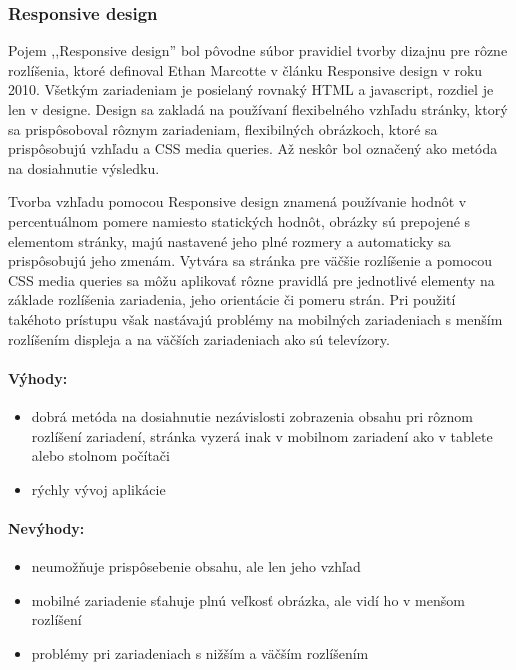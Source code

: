 \subsubsection{Responsive design} %
\label{ssub:responsive_design}

Pojem ,,Responsive design'' bol pôvodne súbor pravidiel tvorby dizajnu pre rôzne rozlíšenia, ktoré definoval Ethan Marcotte v článku Responsive design v roku 2010. Všetkým zariadeniam je posielaný rovnaký HTML a javascript, rozdiel je len v designe. Design sa zakladá na používaní flexibelného vzhľadu stránky, ktorý sa prispôsoboval rôznym zariadeniam, flexibilných obrázkoch, ktoré sa prispôsobujú vzhľadu a CSS media queries. \cite{responsive, mediaqueries} Až neskôr bol označený ako metóda na dosiahnutie výsledku.

Tvorba vzhľadu pomocou Responsive design znamená používanie hodnôt v percentuálnom pomere namiesto statických hodnôt, obrázky sú prepojené s elementom stránky, majú nastavené jeho plné rozmery a automaticky sa prispôsobujú jeho zmenám. Vytvára sa stránka pre väčšie rozlíšenie a pomocou CSS media queries sa môžu aplikovať rôzne pravidlá pre jednotlivé elementy na základe rozlíšenia zariadenia, jeho orientácie či pomeru strán. Pri použití takéhoto prístupu však nastávajú problémy na mobilných zariadeniach s menším rozlíšením displeja a na väčších zariadeniach ako sú televízory.\\



\paragraph{Výhody:}
\begin{itemize}
	\item dobrá metóda na dosiahnutie nezávislosti zobrazenia obsahu pri rôznom rozlíšení zariadení, stránka vyzerá inak v mobilnom zariadení ako v tablete alebo stolnom počítači
	\item rýchly vývoj aplikácie
\end{itemize}

\paragraph{Nevýhody:}
\begin{itemize}
	\item neumožňuje prispôsebenie obsahu, ale len jeho vzhľad
	\item mobilné zariadenie sťahuje plnú veľkosť obrázka, ale vidí ho v menšom rozlíšení
	\item problémy pri zariadeniach s nižším a väčším rozlíšením
\end{itemize}

